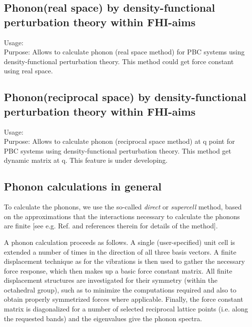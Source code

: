 \subsection*{Phonon(real space) by density-functional perturbation theory within FHI-aims}
{
Usage:  \\[1.0em]
  Purpose: Allows to calculate phonon (real space method) for PBC systems using density-functional perturbation theory. This method could get force constant using real space.\\ }

\subsection*{Phonon(reciprocal space) by density-functional perturbation theory within FHI-aims}
{
Usage:  \\[1.0em]
  Purpose: Allows to calculate phonon (reciprocal space method) at q point for PBC systems using density-functional perturbation theory. This method get dynamic matrix at q.  This feature is under developing.\\ }

\subsection*{Phonon calculations in general}

To calculate the phonons, we use the so-called
\emph{direct} or \emph{supercell} method, based on the approximations
that the interactions necessary to calculate the phonons are
finite [see e.g. Ref. \cite{Parlinski97} and references therein
for details of the method]. 

A phonon calculation proceeds as follows. A single (user-specified)
unit cell is extended a number of times in the direction of all three
basis vectors. A finite displacement technique as for the vibrations is then
used to gather the necessary force response, which then makes up a
basic force constant matrix. All finite displacement structures are
investigated for their symmetry (within the octahedral group), such as
to minimize the computations required and also to obtain properly
symmetrized forces where applicable. Finally, the force constant matrix is
diagonalized for a number of selected reciprocal lattice points
(i.e. along the requested bands) and the eigenvalues give the phonon
spectra. 

